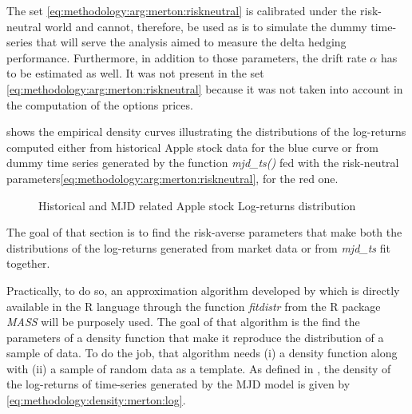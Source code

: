 \documentclass[a4paper, 12pt]{report}
\begin{document}
The set \ref{eq:methodology:arg:merton:riskneutral} is calibrated under the risk-neutral world and cannot, therefore, be used as is to simulate the dummy time-series that will serve the analysis aimed to measure the delta hedging performance.
Furthermore, in addition to those parameters, the drift rate $\alpha$ has to be estimated as well. It was not present in the set  \ref{eq:methodology:arg:merton:riskneutral} because it was not taken into account in the computation of the options prices.

 shows the empirical density curves illustrating the distributions of the log-returns computed either from historical Apple stock data for the blue curve or from dummy time series generated by the function \textit{mjd\_ts()} fed with the risk-neutral parameters\ref{eq:methodology:arg:merton:riskneutral}, for the red one.


\begin{figure}[h]
  \centering
  
  \caption{Historical and MJD related Apple stock Log-returns distribution}
  \label{p:methodology:density:aapl:merton:riskneutral}
\end{figure}



The goal of that section is to find the risk-averse parameters that make both the distributions of the log-returns generated from market data or from \textit{mjd\_ts} fit together.

Practically, to do so, an approximation algorithm developed by \citet{MASS} which is directly available in the R language through the function \textit{fitdistr} from the R package \textit{MASS} will be purposely used. 
The goal of that algorithm is the find the parameters of a density function that make it reproduce the distribution of a sample of data.
To do the job, that algorithm needs (i) a density function along with (ii) a sample of random data as a template.
As defined in \citet{matsuda2004}, the density of the log-returns of time-series generated by the MJD model is given by \cref{eq:methodology:density:merton:log}.
\end{document}
